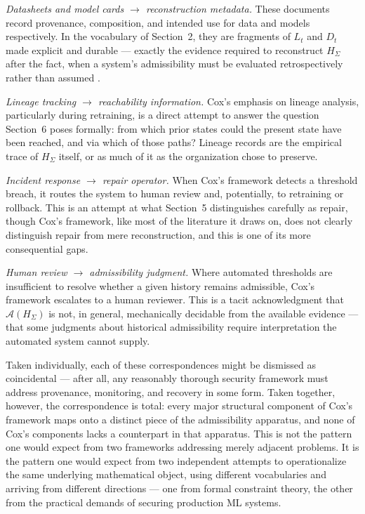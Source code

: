 \documentclass[11pt]{article}
\begin{document}
\emph{Datasheets and model cards $\to$ reconstruction metadata.} These documents record provenance, composition, and intended use for data and models respectively. In the vocabulary of Section~2, they are fragments of $L_t$ and $D_t$ made explicit and durable --- exactly the evidence required to reconstruct $H_\Sigma$ after the fact, when a system's admissibility must be evaluated retrospectively rather than assumed \cite{gebru2021,mitchell2019}.

\emph{Lineage tracking $\to$ reachability information.} Cox's emphasis on lineage analysis, particularly during retraining, is a direct attempt to answer the question Section~6 poses formally: from which prior states could the present state have been reached, and via which of those paths? Lineage records are the empirical trace of $H_\Sigma$ itself, or as much of it as the organization chose to preserve.

\emph{Incident response $\to$ repair operator.} When Cox's framework detects a threshold breach, it routes the system to human review and, potentially, to retraining or rollback. This is an attempt at what Section~5 distinguishes carefully as repair, though Cox's framework, like most of the literature it draws on, does not clearly distinguish repair from mere reconstruction, and this is one of its more consequential gaps.

\emph{Human review $\to$ admissibility judgment.} Where automated thresholds are insufficient to resolve whether a given history remains admissible, Cox's framework escalates to a human reviewer. This is a tacit acknowledgment that $\mathcal{A}(H_\Sigma)$ is not, in general, mechanically decidable from the available evidence --- that some judgments about historical admissibility require interpretation the automated system cannot supply.

Taken individually, each of these correspondences might be dismissed as coincidental --- after all, any reasonably thorough security framework must address provenance, monitoring, and recovery in some form. Taken together, however, the correspondence is total: every major structural component of Cox's framework maps onto a distinct piece of the admissibility apparatus, and none of Cox's components lacks a counterpart in that apparatus. This is not the pattern one would expect from two frameworks addressing merely adjacent problems. It is the pattern one would expect from two independent attempts to operationalize the same underlying mathematical object, using different vocabularies and arriving from different directions --- one from formal constraint theory, the other from the practical demands of securing production ML systems.
\end{document}
